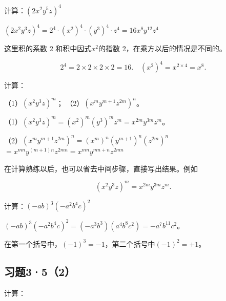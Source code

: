 计算：\((2x^{2}y^{5}z)^{4}\)

\((2x^{2}y^{3}z)^{4} = 2^{4}\cdot (x^{2})^{4}\cdot (y^{3})^{4}\cdot z^{4} = 16x^{8}y^{12}z^{4}\)

 这里积的系数 2 和积中因式\(x^{2}\)的指数
2，在乘方以后的情况是不同的。

\[
2 ^{4} = 2 \times 2 \times 2 \times 2 = 16. \quad (x ^{2}) ^{4} = x ^{2 \times 4} = x ^{8}.
\]

 计算：

（1）\((x^{2}y^{3}z)^{m}\)； （2）\((x^{m}y^{m + 1}z^{2m})^{n}\)。

（1）\((x^{2}y^{3}z)^{m} = (x^{2})^{m}(y^{3})^{m}z^{m} = x^{2m}y^{3m}z^{m}\)。

（2）\((x^{m}y^{m + 1}z^{2m})^{n} = (x^{m})^{n}(y^{m + 1})^{n}(z^{2m})^{n}\)\(= x^{mn}y^{(m + 1)n}z^{2mn} = x^{mn}y^{mn + n}z^{2mn}\)

 在计算熟练以后，也可以省去中间步骤，直接写出结果。例如

\[
(x ^{2} y ^{3} z) ^{m} = x ^{2 m} y ^{3 m} z ^{m}.
\]

 计算：\((-ab)^{3}(-a^{2}b^{4}c)^{2}\)

\((-ab)^{3}(-a^{2}b^{4}c)^{2} = (-a^{3}b^{3})(a^{4}b^{8}c^{2}) = -a^{7}b^{11}c^{2}\)。

在第一个括号中，\((-1)^{3}=-1\)，第二个括号中\((-1)^{2}=+1\)。

\subsection{习题3·5（2）}

计算：

